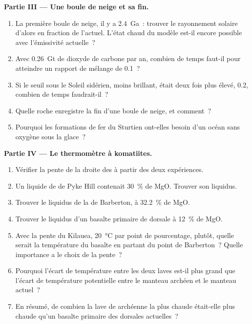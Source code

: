 \begin{problem}
\noindent\textbf{Partie III --- Une boule de neige et sa fin.}
\begin{enumerate}[resume]
  \item La première boule de neige, il y a \qty{2.4}{Ga}~: trouver le rayonnement solaire d'alors en fraction de l'actuel.
        L'état chaud du modèle est-il encore possible avec l'émissivité actuelle~?
  \item Avec \qty{0.26}{Gt} de dioxyde de carbone par an, combien de temps faut-il pour atteindre un rapport de
        mélange de 0.1~?
  \item Si le seuil sous le Soleil sidérien, moins brillant, était deux fois plus élevé, 0.2, combien de temps faudrait-il~?
  \item Quelle roche enregistre la fin d'une boule de neige, et comment~?
  \item Pourquoi les formations de fer du Sturtien ont-elles besoin d'un océan sans oxygène sous la glace~?
\end{enumerate}

\noindent\textbf{Partie IV --- Le thermomètre à komatiites.}
\begin{enumerate}[resume]
  \item Vérifier la pente de la droite des  à partir des deux expériences.
  \item Un liquide de  de Pyke Hill contenait \qty{30}{\percent} de MgO. Trouver son liquidus.
  \item Trouver le liquidus de la  de Barberton, à \qty{32.2}{\percent} de MgO.
  \item Trouver le liquidus d'un basalte primaire de dorsale à \qty{12}{\percent} de MgO.
  \item Avec la pente du Kilauea, \qty{20}{\celsius} par point de pourcentage, plutôt, quelle serait la température du
        basalte en partant du point de Barberton~? Quelle importance a le choix de la pente~?
  \item Pourquoi l'écart de température entre les deux laves est-il plus grand que l'écart de température
        potentielle entre le manteau archéen et le manteau actuel~?
  \item En résumé, de combien la lave de  archéenne la plus chaude était-elle plus chaude qu'un basalte primaire
        des dorsales actuelles~?
\end{enumerate}
\end{problem}
